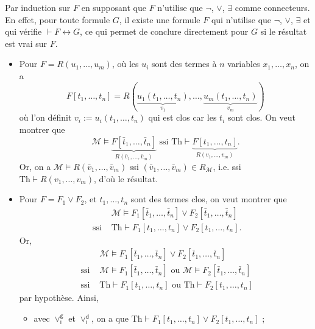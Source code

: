 \documentclass[./main]{subfiles}
\begin{document}
  \begin{prv}
    Par induction sur $F$ en supposant que $F$ n'utilise que $\lnot$, $\lor$,  $\exists$ comme connecteurs.
    En effet, pour toute formule $G$, il existe une formule $F$ qui n'utilise que $\lnot$,  $\lor$,  $\exists$ et qui vérifie $\vdash F \leftrightarrow G$, ce qui permet de conclure directement pour $G$ si le résultat est vrai sur $F$.

    \begin{itemize}
      \item Pour $F = R(u_1, \ldots, u_m)$, où les $u_i$ sont des termes à $n$ variables $x_1, \ldots, x_n$,
        on a \[
          F[t_1, \ldots, t_n] = R(\underbrace{u_1(t_1, \ldots, t_n)}_{v_1}, \ldots, \underbrace{u_m(t_1, \ldots, t_n)}_{v_m})
        \] 
        où l'on définit $v_i := u_i(t_1, \ldots, t_n)$ qui est clos car les $t_i$ sont clos.
        On veut montrer que \[
          \mathcal{M} \models \underbrace{F[\bar{t}_1, \ldots, \bar{t}_n]}_{R(\bar{v}_1, \ldots, \bar{v}_m)} \text{ ssi }
          \mathrm{Th} \vdash \underbrace{F[t_1, \ldots, t_n]}_{R(v_1, \ldots, v_m)}
        .\]
        Or, on a $\mathcal{M} \models R(\bar{v}_1, \ldots, \bar{v}_m)$ ssi $(\bar{v}_1, \ldots, \bar{v}_m) \in R_{\mathcal{M}}$, i.e. ssi $\mathrm{Th} \vdash R(v_1, \ldots, v_m)$, d'où le résultat.
      \item Pour $F = F_1 \lor F_2$, et  $t_1, \ldots, t_n$ sont des termes clos, on veut montrer que 
        \begin{align*}
          &\mathcal{M} \models F_1[\bar{t}_1, \ldots, \bar{t}_n] \lor  F_2[\bar{t}_1, \ldots, \bar{t}_n]\\
          \text{ ssi }&
          \mathrm{Th} \vdash F_1[t_1, \ldots, t_n] \lor  F_2[t_1, \ldots, t_n]
        .\end{align*}
        Or,
        \begin{align*}
          &\mathcal{M} \models F_1[\bar{t}_1, \ldots, \bar{t}_n] \lor  F_2[\bar{t}_1, \ldots, \bar{t}_n] \\
          \text{ ssi }& \mathcal{M} \models F_1[\bar{t}_1, \ldots, \bar{t}_n] \text{ ou } \mathcal{M} \models F_2[\bar{t}_1, \ldots, \bar{t}_n]\\
          \text{ ssi }& \mathrm{Th} \vdash F_1[t_1, \ldots, t_n] \text{ ou } \mathrm{Th} \vdash F_2[t_1, \ldots, t_n]
        \end{align*}
        par hypothèse.
        Ainsi,
        \begin{itemize}
          \item avec $\lor_\mathsf{i}^\mathsf{g}$ et $\lor_\mathsf{i}^\mathsf{d}$, on a que $\mathrm{Th} \vdash F_1[t_1, \ldots, t_n] \lor F_2[t_1, \ldots, t_n]$ ;

\end{itemize}
\end{itemize}
\end{prv}
\end{document}
